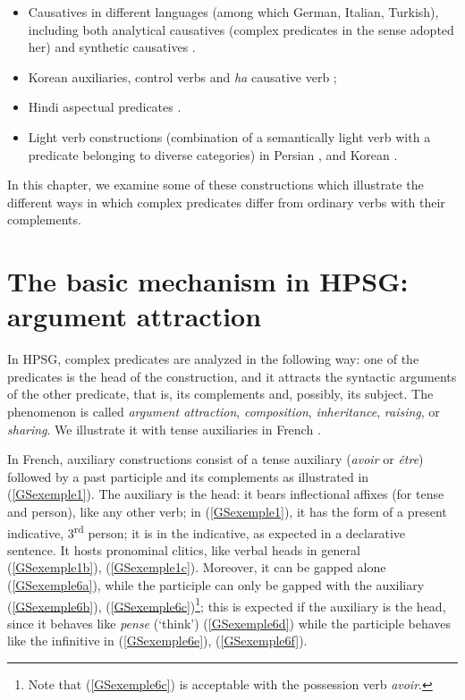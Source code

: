 \documentclass[output=paper
                ,modfonts
                ,nonflat
	        ,collection
	        ,collectionchapter
	        ,collectiontoclongg
 	        ,biblatex
                ,babelshorthands
                ,newtxmath
                ,draftmode
                ,colorlinks, citecolor=brown
]{./langsci/langscibook}
\begin{document}
{\begin{itemize}
	\item Causatives in different languages (among which German, Italian, Turkish), including both analytical causatives (complex predicates in the sense adopted her) and synthetic causatives \citep{Webelhuth98a-u}. 
	
	\item Korean auxiliaries, control verbs and \emph{ha} causative verb \citep{Chung98a-u, Sells1991, Yoo2003, Kim2016a-u};
	
	\item Hindi aspectual predicates \citep{poornima2009hindi}. 
	
	\item Light verb constructions (combination of a semantically light verb with a predicate belonging to diverse categories) in Persian \citep{bonami2010persian, MuellerPersian-unlinked, pollet2012grammaire, bonami2015diversity}, and Korean \citep{Ryu:93, lee2001argument, choi2001mixed, Kim2016a-u}.  
	
\end{itemize}


In this chapter, we examine some of these constructions which illustrate the different ways in which complex predicates differ from ordinary verbs with their complements.


\section{The basic mechanism in HPSG: argument attraction}\label{GSsection2}

In HPSG, complex predicates are analyzed in the following way: one of the predicates is the head of the construction, and it attracts the syntactic arguments of the other predicate, that is, its complements and, possibly, its subject. The phenomenon is called \emph{argument attraction}, \emph{composition}, \emph{inheritance}, \emph{raising}, or \emph{sharing}. We illustrate it with tense auxiliaries in French \citep{abeille1994complementation, AG2002b-u}.

In French, auxiliary constructions consist of a tense auxiliary (\emph{avoir} or \emph{\^etre}) followed by a past participle and its complements as illustrated in (\ref{GSexemple1}). The auxiliary is the head: it bears inflectional affixes (for tense and person), like any other verb; in (\ref{GSexemple1}), it has the form of a present indicative, 3\textsuperscript{rd} person; it is in the indicative, as expected in a declarative sentence. It hosts pronominal clitics, like verbal heads in general (\ref{GSexemple1b}), (\ref{GSexemple1c}). Moreover, it can be gapped alone (\ref{GSexemple6a}), while the participle can only be gapped with the auxiliary (\ref{GSexemple6b}), (\ref{GSexemple6c})\footnote{Note that (\ref{GSexemple6c}) is acceptable with the possession verb \emph{avoir}.}; this is expected if the auxiliary is the head, since it behaves like \emph{pense} (`think') (\ref{GSexemple6d}) while the participle behaves like the infinitive in (\ref{GSexemple6e}), (\ref{GSexemple6f}). 

}
\end{document}
